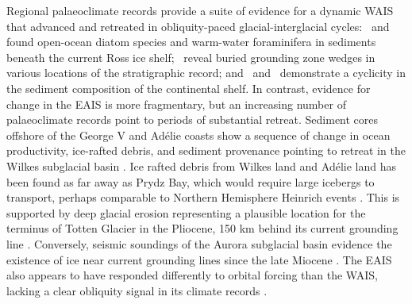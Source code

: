 Regional palaeoclimate records provide a suite of evidence for a dynamic WAIS that advanced and retreated in obliquity-paced glacial-interglacial cycles:~\cite{naishObliquitypacedPlioceneWest2009} and~\cite{seidensteinPliocenePleistoceneWarmwater2024} found open-ocean diatom species and warm-water foraminifera in sediments beneath the current Ross ice shelf;~\cite{gohlSeismicStratigraphicRecord2013,gohlEvidenceHighlyDynamic2021} reveal buried grounding zone wedges in various locations of the stratigraphic record; and~\cite{passchierWestAntarcticIce2025} and~\cite{horikawaRepeatedMajorInland2026} demonstrate a cyclicity in the sediment composition of the continental shelf. In contrast, evidence for change in the EAIS is more fragmentary, but an increasing number of palaeoclimate records point to periods of substantial retreat. Sediment cores offshore of the George V and Adélie coasts show a sequence of change in ocean productivity, ice-rafted debris, and sediment provenance pointing to retreat in the Wilkes subglacial basin \citep{cookDynamicBehaviourEast2013,pattersonOrbitalForcingEast2014,bertramPlioceneDeglacialEvent2018}. Ice rafted debris from Wilkes land and Adélie land has been found as far away as Prydz Bay, which would require large icebergs to transport, perhaps comparable to Northern Hemisphere Heinrich events \citep{williamsEvidenceIcebergArmadas2010}. This is supported by deep glacial erosion representing a plausible location for the terminus of Totten Glacier in the Pliocene, 150 km behind its current grounding line \citep{aitkenRepeatedLargescaleRetreat2016}. Conversely, seismic soundings of the Aurora subglacial basin evidence the existence of ice near current grounding lines since the late Miocene \citep{gulickInitiationLongtermInstability2017}. The EAIS also appears to have responded differently to orbital forcing than the WAIS, lacking a clear obliquity signal in its climate records \citep{pattersonSpatiallyVariableResponse2026}.


